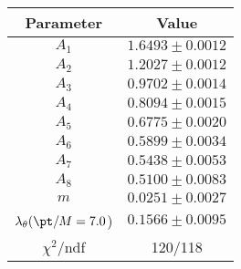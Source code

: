 \begin{tabular}{c|c}
Parameter & Value\\
\hline
$A_1$ & $1.6493\pm0.0012$ \\
$A_2$ & $1.2027\pm0.0012$ \\
$A_3$ & $0.9702\pm0.0014$ \\
$A_4$ & $0.8094\pm0.0015$ \\
$A_5$ & $0.6775\pm0.0020$ \\
$A_6$ & $0.5899\pm0.0034$ \\
$A_7$ & $0.5438\pm0.0053$ \\
$A_8$ & $0.5100\pm0.0083$ \\
$m$ & $0.0251\pm0.0027$ \\
$\lambda_\theta(\pt/M = 7.0$) & $0.1566\pm0.0095$ \\
\hline
$\chi^2$/ndf & 120/118
\end{tabular}
